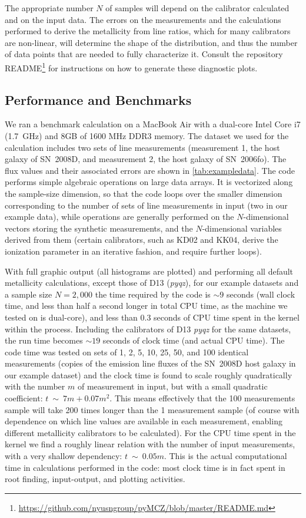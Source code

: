 \documentclass{emulateapj}
\begin{document}
The appropriate number $N$ of samples will depend on the calibrator
calculated and on the input data. The errors on the measurements and
the calculations performed to derive the metallicity from line ratios,
which for many calibrators are non-linear, will determine the shape of
the distribution, and thus the number of data points that are needed
to fully characterize it. Consult the repository
README\footnote{\url{https://github.com/nyusngroup/pyMCZ/blob/master/README.md}}
for instructions on how to generate these diagnostic plots.

\subsection{Performance and Benchmarks}
We ran a benchmark calculation on a MacBook Air with a dual-core Intel
Core i7 (1.7~GHz) and 8GB of 1600 MHz DDR3 memory. The dataset we used
for the calculation includes two sets of line measurements
(measurement 1, the host galaxy of SN~2008D, and measurement 2, the
host galaxy of SN~2006fo). The flux values and their associated errors
are shown in \autoref{tab:exampledata}. The code performs simple
algebraic operations on large data arrays. It is vectorized along the
sample-size dimension, so that the code loops over the smaller
dimension corresponding to the number of sets of line measurements in
input (two in our example data), while operations are generally
performed on the $N$-dimensional vectors storing the synthetic
measurements, and the $N$-dimensional variables derived from them
(certain calibrators, such as KD02 and KK04, derive the ionization
parameter in an iterative fashion, and require further loops).


With full graphic output (all histograms are plotted) and performing
all default metallicity calculations, except those of D13
(\emph{pyqz}), for our example datasets and a sample size $N=2,000$
the time required by the code is $\sim9$ seconds (wall clock time, and
less than half a second longer in total CPU time, as the machine we
tested on is dual-core), and less than 0.3 seconds of CPU time spent
in the kernel within the process. Including the calibrators of D13
\emph{pyqz} for the same datasets, the run time becomes $\sim19$
seconds of clock time (and actual CPU time).  The code time was tested
on sets of 1, 2, 5, 10, 25, 50, and 100 identical measurements (copies
of the emission line fluxes of the SN~2008D host galaxy in our example
dataset) and the clock time is found to scale roughly quadratically
with the number $m$ of measurement in input, but with a small
quadratic coefficient: $t~\sim~7m+0.07m^2$. This means effectively
that the 100 measurements sample will take 200 times longer than the 1
measurement sample (of course with dependence on which line values are
available in each measurement, enabling different metallicity
calibrators to be calculated). For the CPU time spent in the kernel we
find a roughly linear relation with the number of input measurements,
with a very shallow dependency: $t~\sim~ 0.05m$. This is the actual
computational time in calculations performed in the code: most clock
time is in fact spent in root finding, input-output, and plotting
activities.
\end{document}
